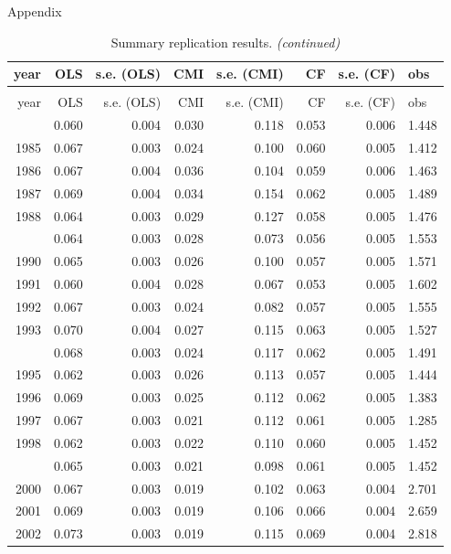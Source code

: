 \documentclass[10pt,ignorenonframetext,]{beamer}
\begin{document}
\begin{frame}[allowframebreaks]{Appendix}
\begingroup\fontsize{7}{9}\selectfont

\begin{longtable}[t]{rrrrrrrl}
\caption{\label{tab:unnamed-chunk-7}Summary replication results.}\\
\toprule
year & OLS & s.e. (OLS) & CMI & s.e. (CMI) & CF & s.e. (CF) & obs\\
\midrule
\endfirsthead
\caption[]{Summary replication results. \textit{(continued)}}\\
\toprule
year & OLS & s.e. (OLS) & CMI & s.e. (CMI) & CF & s.e. (CF) & obs\\
\midrule
\endhead
\
\endfoot
\bottomrule
\endlastfoot
1984 & 0.060 & 0.004 & 0.030 & 0.118 & 0.053 & 0.006 & 1.448\\
1985 & 0.067 & 0.003 & 0.024 & 0.100 & 0.060 & 0.005 & 1.412\\
1986 & 0.067 & 0.004 & 0.036 & 0.104 & 0.059 & 0.006 & 1.463\\
1987 & 0.069 & 0.004 & 0.034 & 0.154 & 0.062 & 0.005 & 1.489\\
1988 & 0.064 & 0.003 & 0.029 & 0.127 & 0.058 & 0.005 & 1.476\\
\addlinespace
1989 & 0.064 & 0.003 & 0.028 & 0.073 & 0.056 & 0.005 & 1.553\\
1990 & 0.065 & 0.003 & 0.026 & 0.100 & 0.057 & 0.005 & 1.571\\
1991 & 0.060 & 0.004 & 0.028 & 0.067 & 0.053 & 0.005 & 1.602\\
1992 & 0.067 & 0.003 & 0.024 & 0.082 & 0.057 & 0.005 & 1.555\\
1993 & 0.070 & 0.004 & 0.027 & 0.115 & 0.063 & 0.005 & 1.527\\
\addlinespace
1994 & 0.068 & 0.003 & 0.024 & 0.117 & 0.062 & 0.005 & 1.491\\
1995 & 0.062 & 0.003 & 0.026 & 0.113 & 0.057 & 0.005 & 1.444\\
1996 & 0.069 & 0.003 & 0.025 & 0.112 & 0.062 & 0.005 & 1.383\\
1997 & 0.067 & 0.003 & 0.021 & 0.112 & 0.061 & 0.005 & 1.285\\
1998 & 0.062 & 0.003 & 0.022 & 0.110 & 0.060 & 0.005 & 1.452\\
\addlinespace
1999 & 0.065 & 0.003 & 0.021 & 0.098 & 0.061 & 0.005 & 1.452\\
2000 & 0.067 & 0.003 & 0.019 & 0.102 & 0.063 & 0.004 & 2.701\\
2001 & 0.069 & 0.003 & 0.019 & 0.106 & 0.066 & 0.004 & 2.659\\
2002 & 0.073 & 0.003 & 0.019 & 0.115 & 0.069 & 0.004 & 2.818\\

\end{longtable}
\end{frame}
\end{document}
